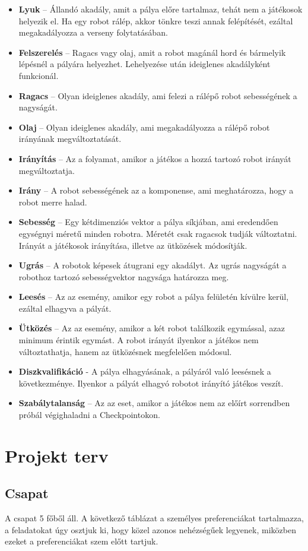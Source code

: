 \begin{itemize}
\item \textbf{Lyuk} – Állandó akadály, amit a pálya előre tartalmaz, tehát nem a játékosok helyezik el. Ha egy robot rálép, akkor tönkre teszi annak felépítését, ezáltal megakadályozza a verseny folytatásában.
\item \textbf{Felszerelés} – Ragacs vagy olaj, amit a robot magánál hord és bármelyik lépésnél a pályára helyezhet. Lehelyezése után ideiglenes akadályként funkcionál.
\item \textbf{Ragacs} – Olyan ideiglenes akadály, ami felezi a rálépő robot sebességének a nagyságát.
\item \textbf{Olaj} – Olyan ideiglenes akadály, ami megakadályozza a rálépő robot irányának megváltoztatását.
\item \textbf{Irányítás} – Az a folyamat, amikor a játékos a hozzá tartozó robot irányát megváltoztatja.
\item \textbf{Irány} – A robot sebességének az a komponense, ami meghatározza, hogy a robot merre halad.
\item \textbf{Sebesség} – Egy kétdimenziós vektor a pálya síkjában, ami eredendően egységnyi méretű minden robotra. Méretét csak ragacsok tudják változtatni. Irányát a játékosok irányítása, illetve az ütközések módosítják.
\item \textbf{Ugrás} – A robotok képesek átugrani egy akadályt. Az ugrás nagyságát a robothoz tartozó sebességvektor nagysága határozza meg.
\item \textbf{Leesés} – Az az esemény, amikor egy robot a pálya felületén kívülre kerül, ezáltal elhagyva a pályát.  
\item \textbf{Ütközés} – Az az esemény, amikor a két robot találkozik egymással, azaz minimum érintik egymást. A robot irányát ilyenkor a játékos nem változtathatja, hanem az ütközésnek megfelelően módosul.
\item \textbf{Diszkvalifikáció} - A pálya elhagyásának, a pályáról való leesésnek a következménye. Ilyenkor a pályát elhagyó robotot irányító játékos veszít.
\item \textbf{Szabálytalanság} – Az az eset, amikor a játékos nem az előírt sorrendben próbál végighaladni a Checkpointokon.

\end{itemize}


\section{Projekt terv}
\subsection{Csapat}
A csapat 5 főből áll. A következő táblázat a személyes preferenciákat tartalmazza, a feladatokat úgy osztjuk ki, hogy közel azonos nehézségűek legyenek, miközben ezeket a preferenciákat szem előtt tartjuk.


